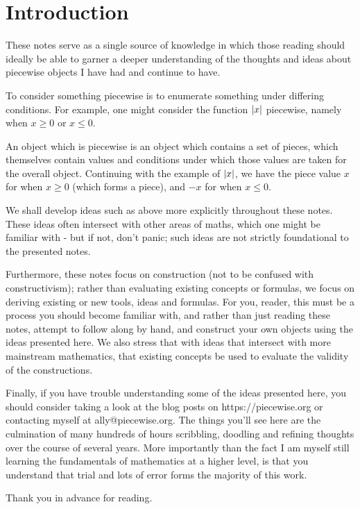 \section{Introduction}
These notes serve as a single source of knowledge in which those reading should ideally be able to garner a deeper understanding of the thoughts and ideas about piecewise objects I have had and continue to have.

To consider something piecewise is to enumerate something under differing conditions. For example, one might consider the function $\abs{x}$ piecewise, namely when $x\geq 0$ or $x\leq 0$.

An object which is piecewise is an object which contains a set of pieces, which themselves contain values and conditions under which those values are taken for the overall object. Continuing with the example of $\abs{x}$, we have the piece value $x$ for when $x\geq 0$ (which forms a piece), and $-x$ for when $x\leq 0$.

We shall develop ideas such as above more explicitly throughout these notes. These ideas often intersect with other areas of maths, which one might be familiar with - but if not, don't panic; such ideas are not strictly foundational to the presented notes. 

Furthermore, these notes focus on construction (not to be confused with constructivism); rather than evaluating existing concepts or formulas, we focus on deriving existing or new tools, ideas and formulas. For you, reader, this must be a process you should become familiar with, and rather than just reading these notes, attempt to follow along by hand, and construct your own objects using the ideas presented here. We also stress that with ideas that intersect with more mainstream mathematics, that existing concepts be used to evaluate the validity of the constructions.

Finally, if you have trouble understanding some of the ideas presented here, you should consider taking a look at the blog posts on https://piecewise.org or contacting myself at ally@piecewise.org. The things you'll see here are the culmination of many hundreds of hours scribbling, doodling and refining thoughts over the course of several years. More importantly than the fact I am myself still learning the fundamentals of mathematics at a higher level, is that you understand that trial and lots of error forms the majority of this work.

Thank you in advance for reading.

\newpage